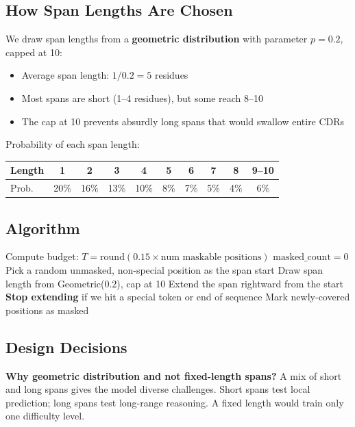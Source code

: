 \documentclass[11pt]{article}
\begin{document}
\subsection{How Span Lengths Are Chosen}
We draw span lengths from a \textbf{geometric distribution} with
parameter $p = 0.2$, capped at 10:

\begin{itemize}
\item Average span length: $1/0.2 = 5$ residues
\item Most spans are short (1--4 residues), but some reach 8--10
\item The cap at 10 prevents absurdly long spans that would swallow
      entire CDRs
\end{itemize}

Probability of each span length:
\begin{center}
\begin{tabular}{lccccccccc}
\toprule
Length & 1 & 2 & 3 & 4 & 5 & 6 & 7 & 8 & 9--10 \\
\midrule
Prob. & 20\% & 16\% & 13\% & 10\% & 8\% & 7\% & 5\% & 4\% & 6\% \\
\bottomrule
\end{tabular}
\end{center}

\subsection{Algorithm}
\begin{algorithm}[H]
\caption{Span Masking}
\begin{algorithmic}[1]
\State Compute budget: $T = \text{round}(0.15 \times \text{num maskable positions})$
\State $\text{masked\_count} = 0$
    \State Pick a random unmasked, non-special position as the span start
    \State Draw span length from Geometric($0.2$), cap at 10
    \State Extend the span rightward from the start
    \State \textbf{Stop extending} if we hit a special token or end of sequence
    \State Mark newly-covered positions as masked
\EndWhile
\end{algorithmic}
\end{algorithm}

\subsection{Design Decisions}

\textbf{Why geometric distribution and not fixed-length spans?}
A mix of short and long spans gives the model diverse challenges.
Short spans test local prediction; long spans test long-range
reasoning. A fixed length would train only one difficulty level.
\end{document}
